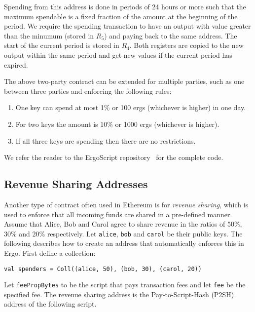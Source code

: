 \documentclass[runningheads]{llncs}
\newcommand{\langname}{ErgoScript\xspace}
\begin{document}
Spending from this address is done in periods of 24 hours or more such that the maximum spendable is a fixed fraction of the amount at the beginning of the period. We require the spending transaction to have an output with value greater than the minumum (stored in $R_5$) and paying back to the same address. The start of the current period is stored in $R_4$. Both registers are copied to the new output within the same period and get new values if the current period has expired. 

The above two-party contract can be extended for multiple parties, such as one between three parties and enforcing the following rules:

\begin{enumerate}
	\item One key can spend at most 1\% or 100 ergs (whichever is higher) in one day.
	\item For two keys the amount is 10\% or 1000 ergs (whichever is higher).
	\item If all three keys are spending then there are no restrictions. 
\end{enumerate}

We refer the reader to the \langname repository~\cite{langrepo} for the complete code.

\subsection{Revenue Sharing Addresses}
\label{revenue-sharing}

Another type of contract often used in Ethereum is for {\em revenue sharing}, which is used to
enforce that all incoming funds are shared in a pre-defined manner.
Assume that Alice, Bob and Carol agree to share revenue in the ratios of 50\%, 30\% and 20\% respectively. Let \texttt{alice}, \texttt{bob} and \texttt{carol} be their public keys. The following describes how to create an address that automatically enforces this in Ergo. First define a collection: 
\begin{verbatim}
val spenders = Coll((alice, 50), (bob, 30), (carol, 20))
\end{verbatim}

Let \texttt{feePropBytes} to be the script that pays transaction fees and let \texttt{fee} be the specified fee. 
The revenue sharing address is the Pay-to-Script-Hash (P2SH) address of the following script.
\end{document}
